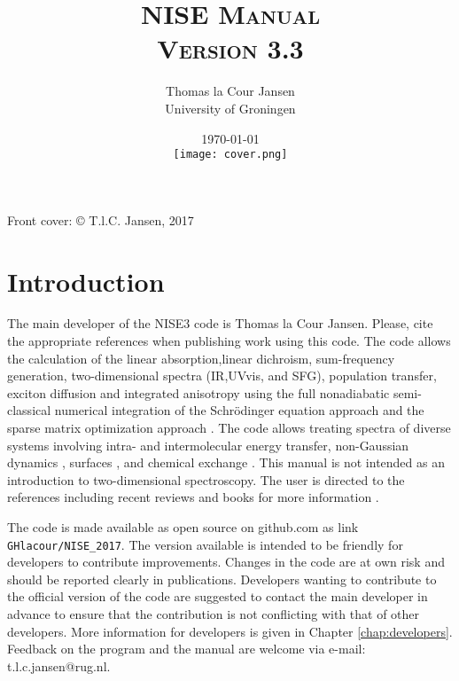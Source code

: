 \documentclass[12pt]{book}
\title{\textsc{NISE Manual\\ Version 3.3}}
\author{Thomas la Cour Jansen\\ University of Groningen}
\date{\today\\ \texttt{[image: cover.png]}}
\begin{document}
\maketitle

\thispagestyle{empty}
\rule{0mm}{0mm}
\noindent
\thispagestyle{empty}
Front cover: 
\copyright \/ T.l.C. Jansen, 2017
\setcounter{page}{1}
\thispagestyle{empty}
\clearpage

\setcounter{page}{1}


\chapter{Introduction}
The main developer of the NISE3 code is Thomas la Cour Jansen. Please, cite the appropriate
references \cite{Jansen.2006.JPCB.110.22910,Jansen.2009.ACR.42.1405,Jansen.2010.JCP.132.224503,Liang.2012.JCTC.8.1706,Liang.2013.JPCL.4.448}
when publishing work using this code. The code allows the calculation of the linear absorption,linear dichroism, sum-frequency generation, two-dimensional spectra (IR,UVvis, and SFG), population transfer, exciton diffusion and integrated anisotropy using the full nonadiabatic semi-classical numerical integration of the Schr\"{o}dinger equation approach
\cite{Jansen.2009.ACR.42.1405} and the sparse matrix optimization approach \cite{Liang.2012.JCTC.8.1706}. The code allows treating spectra of diverse systems involving
intra- and intermolecular energy transfer\cite{Jansen.2006.JPCB.110.22910,Cringus.2007.JCP.127.084507,Jansen.2008.BJ.94.1818,Dijkstra.2010.JPCA.114.7315,Jansen.2010.JCP.132.224503}, non-Gaussian dynamics \cite{Jansen.2009.JPCA.113.6260,Roy.2011.JPCB.115.5431}, surfaces \cite{Liang.2013.JPCL.4.448}, and chemical exchange \cite{Jansen.2007.JCP.127.234502}. This manual is not intended as an introduction to two-dimensional
spectroscopy. The user is directed to the references including recent reviews \cite{Hamm.1998.JPCB.102.6123,Hochstrasser.2001.CP.266.273,Cho.2008.CR.108.1331,Mukamel.2000.ARPC.51.691,Jansen.2009.ACR.42.1405} and books
for more information \cite{Cho.2009.B01,Mukamel.1995.B01,Hamm.2011.B01}.

The code is made available as open source on github.com as link {\tt GHlacour/NISE\_2017}. The version available is intended to be friendly for developers to contribute improvements. Changes in the code are at own risk and should be reported clearly in publications. Developers wanting to contribute to the official version of the code are suggested to contact the main developer in advance to ensure that the contribution is not conflicting with that of other developers. More information for developers is given in Chapter \ref{chap:developers}. Feedback on the program and the manual are welcome via e-mail: t.l.c.jansen@rug.nl. 
\end{document}
